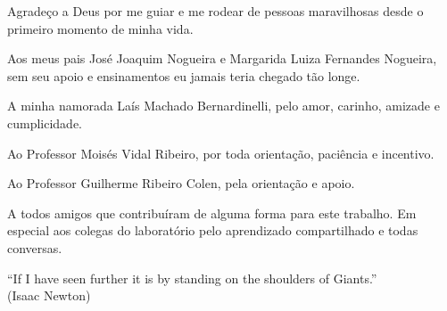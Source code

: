 \begin{agradecimentos}
	
   Agrade\c{c}o a Deus por me guiar e me rodear de pessoas maravilhosas desde o primeiro momento de minha vida.

   Aos meus pais Jos{\'{e}} Joaquim Nogueira e Margarida Luiza Fernandes Nogueira, sem seu apoio e ensinamentos eu jamais teria chegado t{\~{a}}o longe.

   A minha namorada La{\'{i}}s Machado Bernardinelli, pelo amor, carinho, amizade e cumplicidade.

   Ao Professor Mois{\'{e}}s Vidal Ribeiro, por toda orienta\c{c}{\~{a}}o, paci{\^{e}}ncia e incentivo.

   Ao Professor Guilherme Ribeiro Colen, pela orienta\c{c}{\~{a}}o e apoio.

   A todos amigos que contribu{\'{i}}ram de alguma forma para este trabalho. Em especial aos colegas do laborat{\'{o}}rio pelo aprendizado compartilhado e todas conversas.
	
\end{agradecimentos}
 \renewcommand*\epigraphname{\textbf{EPIGRAPH}}

 \begin{epigrafe}
 	\vspace*{\fill}
 	\begin{flushright}
 		``If I have seen further it is by standing on the shoulders of Giants.'' \\
 		(Isaac Newton) \\
 	\end{flushright}
 \end{epigrafe}

